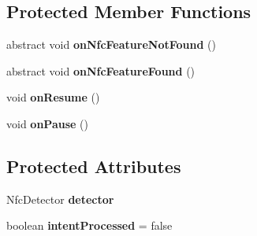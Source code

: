 \subsection*{Protected Member Functions}
\begin{DoxyCompactItemize}
\item 
\hypertarget{classcom_1_1antares_1_1nfc_1_1client_1_1_nfc_detector_activity_a2c9bf9db9285df2509546787663ed789}{abstract void {\bfseries on\-Nfc\-Feature\-Not\-Found} ()}\label{classcom_1_1antares_1_1nfc_1_1client_1_1_nfc_detector_activity_a2c9bf9db9285df2509546787663ed789}

\item 
\hypertarget{classcom_1_1antares_1_1nfc_1_1client_1_1_nfc_detector_activity_a22d1a07dc46d63772b15c7f317376fde}{abstract void {\bfseries on\-Nfc\-Feature\-Found} ()}\label{classcom_1_1antares_1_1nfc_1_1client_1_1_nfc_detector_activity_a22d1a07dc46d63772b15c7f317376fde}

\item 
\hypertarget{classcom_1_1antares_1_1nfc_1_1client_1_1_nfc_detector_activity_a96e49bf9db69c159474d4e19db883bc2}{void {\bfseries on\-Resume} ()}\label{classcom_1_1antares_1_1nfc_1_1client_1_1_nfc_detector_activity_a96e49bf9db69c159474d4e19db883bc2}

\item 
\hypertarget{classcom_1_1antares_1_1nfc_1_1client_1_1_nfc_detector_activity_a62eb608c6fd24c7c89ddb73a8a3a8c20}{void {\bfseries on\-Pause} ()}\label{classcom_1_1antares_1_1nfc_1_1client_1_1_nfc_detector_activity_a62eb608c6fd24c7c89ddb73a8a3a8c20}

\end{DoxyCompactItemize}
\subsection*{Protected Attributes}
\begin{DoxyCompactItemize}
\item 
\hypertarget{classcom_1_1antares_1_1nfc_1_1client_1_1_nfc_detector_activity_a1435827516fee4c1415e663c48dd4358}{Nfc\-Detector {\bfseries detector}}\label{classcom_1_1antares_1_1nfc_1_1client_1_1_nfc_detector_activity_a1435827516fee4c1415e663c48dd4358}

\item 
\hypertarget{classcom_1_1antares_1_1nfc_1_1client_1_1_nfc_detector_activity_aa778540027b88801aba0321cb30382d3}{boolean {\bfseries intent\-Processed} = false}\label{classcom_1_1antares_1_1nfc_1_1client_1_1_nfc_detector_activity_aa778540027b88801aba0321cb30382d3}

\end{DoxyCompactItemize}
